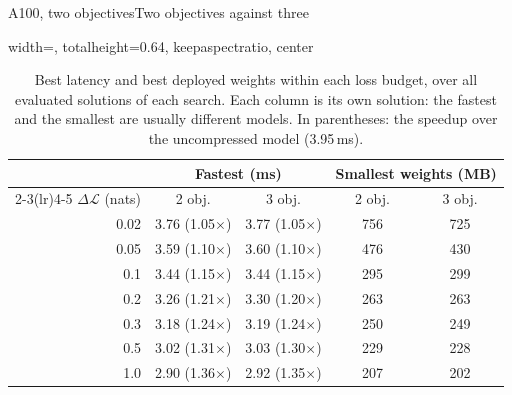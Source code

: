 \documentclass[aspectratio=169,10pt]{beamer}
\newcommand{\dloss}{\Delta\mathcal{L}}
\begin{document}
\begin{frame}{A100, two objectives}{Two objectives against three}
\begin{table}
\centering
\begin{adjustbox}{width=\linewidth, totalheight=0.64\textheight, keepaspectratio, center}
\centering
\small
\begin{tabular}{rcccc}
\toprule
& \multicolumn{2}{c}{Fastest (ms)} & \multicolumn{2}{c}{Smallest weights (MB)} \\
\cmidrule(lr){2-3}\cmidrule(lr){4-5}
$\dloss$ (nats) & 2 obj. & 3 obj. & 2 obj. & 3 obj. \\
\midrule
0.02 & 3.76 (1.05$\times$) & 3.77 (1.05$\times$) & 756 & 725 \\
0.05 & 3.59 (1.10$\times$) & 3.60 (1.10$\times$) & 476 & 430 \\
0.1  & 3.44 (1.15$\times$) & 3.44 (1.15$\times$) & 295 & 299 \\
0.2  & 3.26 (1.21$\times$) & 3.30 (1.20$\times$) & 263 & 263 \\
0.3  & 3.18 (1.24$\times$) & 3.19 (1.24$\times$) & 250 & 249 \\
0.5  & 3.02 (1.31$\times$) & 3.03 (1.30$\times$) & 229 & 228 \\
1.0  & 2.90 (1.36$\times$) & 2.92 (1.35$\times$) & 207 & 202 \\
\bottomrule
\end{tabular}
\end{adjustbox}
\caption{Best latency and best deployed weights within each loss budget, over all evaluated solutions of
each search. Each column is its own solution: the fastest and the smallest are usually different models. In parentheses: the speedup over the uncompressed model (3.95\,ms).}\label{tab:a100-budget}
\end{table}
\end{frame}
\end{document}
